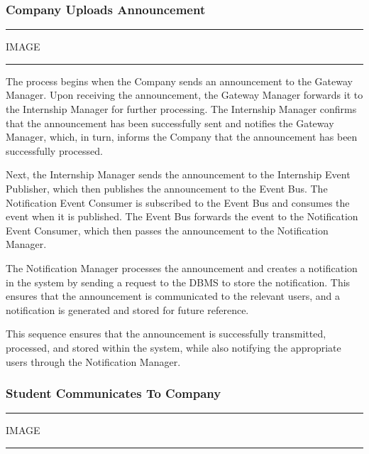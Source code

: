 \subsubsection{Company Uploads Announcement}

\vspace{20pt}
\hrule
\vspace{10pt}
IMAGE
\vspace{10pt}
\hrule
\vspace{20pt}

The process begins when the Company sends an announcement to the Gateway Manager. Upon receiving the announcement, the Gateway Manager forwards it to the Internship Manager for further processing. The Internship Manager confirms that the announcement has been successfully sent and notifies the Gateway Manager, which, in turn, informs the Company that the announcement has been successfully processed.

Next, the Internship Manager sends the announcement to the Internship Event Publisher, which then publishes the announcement to the Event Bus. The Notification Event Consumer is subscribed to the Event Bus and consumes the event when it is published. The Event Bus forwards the event to the Notification Event Consumer, which then passes the announcement to the Notification Manager.

The Notification Manager processes the announcement and creates a notification in the system by sending a request to the DBMS to store the notification. This ensures that the announcement is communicated to the relevant users, and a notification is generated and stored for future reference.

This sequence ensures that the announcement is successfully transmitted, processed, and stored within the system, while also notifying the appropriate users through the Notification Manager.

\subsubsection{Student Communicates To Company}

\vspace{20pt}
\hrule
\vspace{10pt}
IMAGE
\vspace{10pt}
\hrule
\vspace{20pt}

